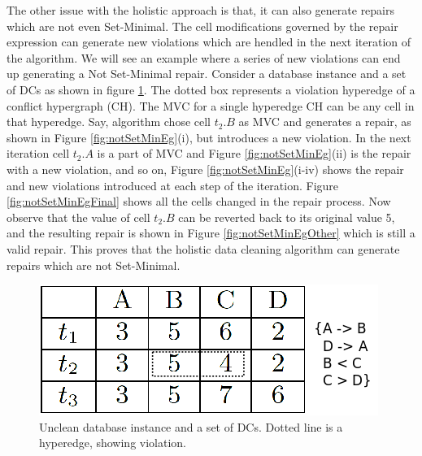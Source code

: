 The other issue with the holistic approach is that, it can also generate repairs which are not even Set-Minimal.
The cell modifications governed by the repair expression can generate new violations which are hendled in the next iteration of the algorithm.
We will see an example where a series of new violations can end up generating a Not Set-Minimal repair.
Consider a database instance and a set of DCs as shown in figure \ref{fig:eg4}.
The dotted box represents a violation hyperedge of a conflict hypergraph (CH).
The MVC for a single hyperedge CH can be any cell in that hyperedge.
Say, algorithm chose cell $t_2.B$ as MVC and generates a repair, as shown in Figure \ref{fig:notSetMinEg}(i), but introduces a new violation.
In the next iteration cell $t_2.A$ is a part of MVC and Figure \ref{fig:notSetMinEg}(ii) is the repair with a new violation, and so on, 
Figure \ref{fig:notSetMinEg}(i-iv) shows the repair and new violations introduced at each step of the iteration.
Figure \ref{fig:notSetMinEgFinal} shows all the cells changed in the repair process.
Now observe that the value of cell $t_2.B$ can be reverted back to its original value 5, and the resulting repair is shown in Figure \ref{fig:notSetMinEgOther} which is still a valid repair.
This proves that the holistic data cleaning algorithm can generate repairs which are not Set-Minimal.

\begin{figure}
   \centering
   \includegraphics[scale=0.25]{eg4.png}
   \caption{Unclean database instance and a set of DCs. Dotted line is a hyperedge, showing violation.}
   \label{fig:eg4}
\end{figure}

